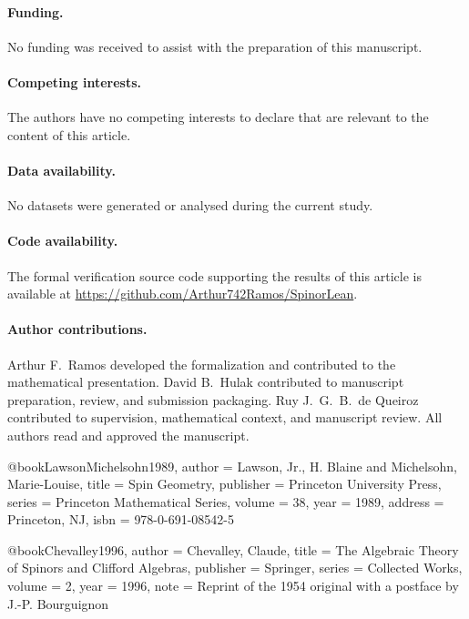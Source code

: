 \documentclass{birkjour}
\theoremstyle{plain}
\theoremstyle{definition}
\theoremstyle{remark}
\begin{document}
\paragraph{Funding.}
No funding was received to assist with the preparation of this manuscript.

\paragraph{Competing interests.}
The authors have no competing interests to declare that are relevant to the
content of this article.

\paragraph{Data availability.}
No datasets were generated or analysed during the current study.

\paragraph{Code availability.}
The formal verification source code supporting the results of this article is
available at \url{https://github.com/Arthur742Ramos/SpinorLean}.

\paragraph{Author contributions.}
Arthur F.~Ramos developed the formalization and contributed to the mathematical
presentation. David B.~Hulak contributed to manuscript preparation, review, and
submission packaging. Ruy J.~G.~B.~de Queiroz contributed to supervision,
mathematical context, and manuscript review. All authors read and approved the
manuscript.

\begingroup
\raggedright

@book{LawsonMichelsohn1989,
  author    = {Lawson, Jr., H. Blaine and Michelsohn, Marie-Louise},
  title     = {Spin Geometry},
  publisher = {Princeton University Press},
  series    = {Princeton Mathematical Series},
  volume    = {38},
  year      = {1989},
  address   = {Princeton, NJ},
  isbn      = {978-0-691-08542-5}
}

@book{Chevalley1996,
  author    = {Chevalley, Claude},
  title     = {The Algebraic Theory of Spinors and Clifford Algebras},
  publisher = {Springer},
  series    = {Collected Works},
  volume    = {2},
  year      = {1996},
  note      = {Reprint of the 1954 original with a postface by J.-P. Bourguignon}
}
\end{document}

